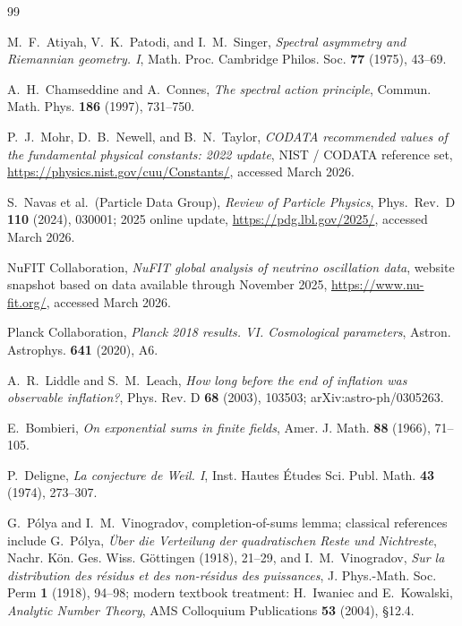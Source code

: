 \documentclass[11pt,a4paper]{article}
\theoremstyle{definition}
\theoremstyle{remark}
\begin{document}
\begin{thebibliography}{99}

M.~F.~Atiyah, V.~K.~Patodi, and I.~M.~Singer,
\newblock \emph{Spectral asymmetry and Riemannian geometry. I},
\newblock Math. Proc. Cambridge Philos. Soc. \textbf{77} (1975), 43--69.

A.~H.~Chamseddine and A.~Connes,
\newblock \emph{The spectral action principle},
\newblock Commun. Math. Phys. \textbf{186} (1997), 731--750.

P.~J.~Mohr, D.~B.~Newell, and B.~N.~Taylor,
\newblock \emph{CODATA recommended values of the fundamental physical constants: 2022 update},
\newblock NIST / CODATA reference set, \url{https://physics.nist.gov/cuu/Constants/}, accessed March 2026.

S.~Navas et al.\ (Particle Data Group),
\newblock \emph{Review of Particle Physics},
\newblock Phys.\ Rev.\ D \textbf{110} (2024), 030001; 2025 online update, \url{https://pdg.lbl.gov/2025/}, accessed March 2026.

NuFIT Collaboration,
\newblock \emph{NuFIT global analysis of neutrino oscillation data},
\newblock website snapshot based on data available through November 2025, \url{https://www.nu-fit.org/}, accessed March 2026.

Planck Collaboration,
\newblock \emph{Planck 2018 results. VI. Cosmological parameters},
\newblock Astron. Astrophys. \textbf{641} (2020), A6.

A.~R.~Liddle and S.~M.~Leach,
\newblock \emph{How long before the end of inflation was observable inflation?},
\newblock Phys. Rev. D \textbf{68} (2003), 103503; arXiv:astro-ph/0305263.

E.~Bombieri,
\newblock \emph{On exponential sums in finite fields},
\newblock Amer. J. Math. \textbf{88} (1966), 71--105.

P.~Deligne,
\newblock \emph{La conjecture de Weil. I},
\newblock Inst. Hautes \'Etudes Sci. Publ. Math. \textbf{43} (1974), 273--307.

G.~P\'olya and I.~M.~Vinogradov,
\newblock completion-of-sums lemma; classical references include
G.~P\'olya, \emph{\"Uber die Verteilung der quadratischen Reste und Nichtreste},
Nachr. K\"on. Ges. Wiss. G\"ottingen (1918), 21--29, and
I.~M.~Vinogradov, \emph{Sur la distribution des r\'esidus et des non-r\'esidus des puissances},
J. Phys.-Math. Soc. Perm \textbf{1} (1918), 94--98; modern textbook treatment:
H.~Iwaniec and E.~Kowalski, \emph{Analytic Number Theory},
AMS Colloquium Publications \textbf{53} (2004), \S 12.4.


\end{thebibliography}
\end{document}
